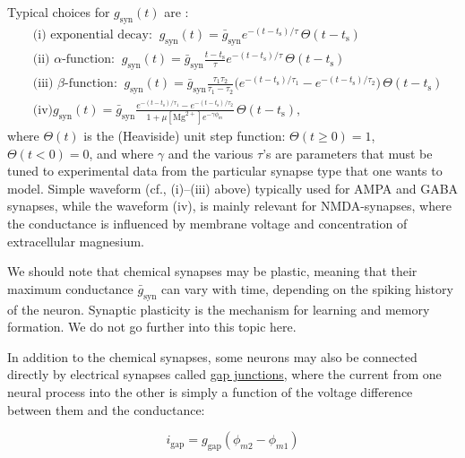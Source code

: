Typical choices for $g_\text{syn}(t)$ are : 
\begin{align}
&\text{(i) exponential decay:} \;\; g_\text{syn}(t) = \bar{g}_\text{syn} e^{-(t-t_\text{s})/\tau}\, \Theta(t-t_\text{s}) \\
&\text{(ii) $\alpha$-function:} \;\; g_\text{syn}(t) = \bar{g}_\text{syn} \frac{t-t_\text{s}}{\tau} e^{-(t-t_\text{s})/\tau} \, \Theta(t-t_\text{s}) \\
&\text{(iii) $\beta$-function:} \;\; g_\text{syn}(t) = \bar{g}_\text{syn} \frac{\tau_1 \tau_2}{\tau_1-\tau_2} 
\Big( e^{-(t-t_\text{s})/\tau_1} - e^{-(t-t_\text{s})/\tau_2} \Big) \, \Theta(t-t_\text{s}) \\
& \text{(iv)} g_\text{syn}(t) = \bar{g}_\text{syn} \frac{e^{-(t-t_\text{s})/\tau_1} - e^{-(t-t_\text{s})/\tau_2}} {1+\mu [\text{Mg}^{2+}] e^{-\gamma \phi_m} } \, \Theta(t-t_\text{s}),
\label{Neuron:eq:synapseforms}
\end{align}
where $\Theta(t)$ is the (Heaviside) unit step function: $\Theta(t \ge 0)=1$,  $\Theta(t< 0)=0$, and where $\gamma$ and the various $\tau$'s are parameters that must be tuned to experimental data from the particular synapse type that one wants to model. 
Simple waveform (cf., (i)--(iii) above) typically used for AMPA  and GABA synapses, while the waveform (iv), is mainly relevant for NMDA-synapses, where the conductance is influenced by membrane voltage and concentration of extracellular magnesium. 

We should note that chemical synapses may be plastic, meaning that their maximum conductance $\bar{g}_\text{syn}$ can vary with time, depending on the spiking history of the neuron. Synaptic plasticity is the mechanism for learning and memory formation. We do not go further into this topic here. 

In addition to the chemical synapses, some neurons may also be connected directly by electrical synapses called \underline{gap junctions}, where the current from one neural process into the other is simply a function of the voltage difference between them and the conductance: 

\begin{equation}
i_\text{gap}=g_\text{gap} (\phi_{m2}-\phi_{m1})
\label{Neuron:eq:gapjunction}
\end{equation}



